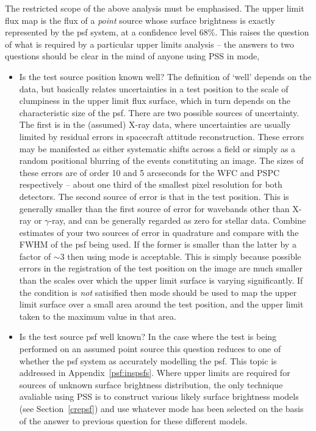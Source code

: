 The restricted scope of the above analysis must be emphasised. The
upper limit flux map is the flux of a {\em point} source whose surface
brightness is exactly represented by the psf system, at a confidence
level 68\%. This raises the question of what is required by a particular
upper limits analysis -- the answers to two questions should be clear
in the mind of anyone using PSS in  mode,
\begin{itemize}                                          
\item Is the test source position known well? The definition of `well'
depends on
the data, but basically relates uncertainties in a test position to the
scale of clumpiness in the upper limit flux surface, which in turn 
depends on the characteristic size of the psf. There are two possible 
sources of
uncertainty. The first is in the (assumed) X-ray data, where uncertainties
are usually limited by residual errors in spacecraft attitude reconstruction.
These errors may be manifested as either systematic shifts across a field
or simply as a random positional blurring of the events constituting an
image. The sizes of these errors are of order 10 and 5 arcseconds for the
WFC and PSPC respectively -- about one third of the smallest pixel
resolution for both detectors. The second source of error is that in the
test position. This is generally smaller than the first source of error
for wavebands other than X-ray or $\gamma$-ray, and can be generally regarded
as zero for stellar data. Combine estimates of your two sources of error in
quadrature and compare with the FWHM of the psf being used. If the former
is smaller than the latter by a factor of $\sim 3$ then using 
mode is acceptable. This is simply because possible errors in the
registration of the test position on the image are much smaller than the
scales over which the upper limit surface is varying significantly. If the
condition is {\em not} satisified then  mode should be used to
map the upper limit surface over a small area around the test position, and
the upper limit taken to the maximum value in that area.
\item Is the test source psf well known? In the case where the test is
being performed on an assumed point source this question reduces to one
of whether the psf system as accurately modelling the psf. This topic
is addressed in Appendix~\ref{psf:inspsfs}. Where upper limits are
required for sources of unknown surface brightness distribution, the
only technique avaliable using PSS is to construct various likely surface
brightness models (see Section~\ref{crepsf}) and use whatever
mode has been selected on the basis of the answer to previous question
for these different models. 
\end{itemize}
                                      
